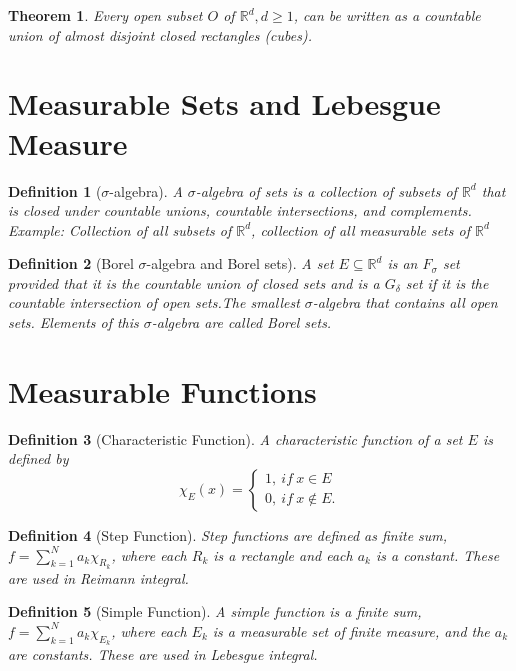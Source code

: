 \documentclass{report}
\newtheorem{thm}{Theorem}
\newtheorem{defn}{Definition}
\newcommand{\reals}{\mathbb{R}}
\begin{document}
\begin{thm}
	Every open subset $O$ of $\reals^d, d \geq 1$, can be written as a countable union of almost disjoint closed rectangles (cubes).
\end{thm}
\section{Measurable Sets and Lebesgue Measure}
\begin{defn}[$\sigma$-algebra]
	A $\sigma$-algebra of sets is a collection of subsets of $\reals^d$ that is closed under countable unions, countable intersections, and complements. Example: Collection of all subsets of $\reals^d$, collection of all measurable sets of $\reals^d$
\end{defn}
\begin{defn}[Borel $\sigma$-algebra and Borel sets]
	A set $E \subseteq \reals^d $ is an $F_\sigma$ set provided that it is the countable union of closed	sets and is a $G_\delta$ set if it is the countable intersection of open sets.The smallest $\sigma$-algebra that contains all open sets. Elements of this $\sigma$-algebra are called	Borel sets.
\end{defn}
\section{Measurable Functions}
\begin{defn}[Characteristic Function]
	A characteristic function of a set $E$ is defined by 
	$$
	 \chi_E(x) = \begin{cases}
	1,\ if\ x \in E \\
	0,\ if\ x \notin E.
	\end{cases}
	$$
\end{defn}
\begin{defn}[Step Function]
	Step functions are defined as finite sum, $ f = \sum_{k=1}^{N} a_k \chi_{R_k} $, where each $R_k$ is a rectangle and each $a_k$ is a constant. These are used in Reimann integral.
\end{defn}
\begin{defn}[Simple Function]
	A simple function is a finite sum,  $ f = \sum_{k=1}^{N} a_k \chi_{E_k} $, where each $E_k$ is a measurable set of finite measure, and the $a_k$ are constants. These are used in Lebesgue integral.
\end{defn}
\end{document}
